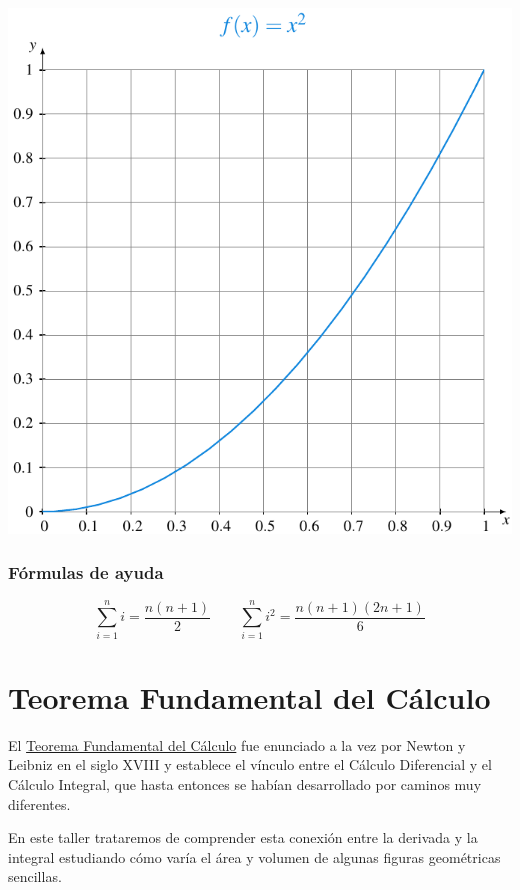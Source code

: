 \documentclass[
  a4paper,
]{scrreport}
\begin{document}
\includegraphics{img/sumas-riemann/parabola-figure0.pdf}

\hypertarget{fuxf3rmulas-de-ayuda}{%
\subsection{Fórmulas de ayuda}\label{fuxf3rmulas-de-ayuda}}

\[
\sum_{i=1}^n i = \dfrac{n(n+1)}{2}\qquad \sum_{i=1}^n i^2 = \dfrac{n(n+1)(2n+1)}{6}
\]


\hypertarget{teorema-fundamental-del-cuxe1lculo}{%
\chapter{Teorema Fundamental del
Cálculo}\label{teorema-fundamental-del-cuxe1lculo}}

El
\href{https://aprendeconalf.es/analisis-manual/09-integrales.html\#thm-teorema-fundamental-calculo-1}{Teorema
Fundamental del Cálculo} fue enunciado a la vez por Newton y Leibniz en
el siglo XVIII y establece el vínculo entre el Cálculo Diferencial y el
Cálculo Integral, que hasta entonces se habían desarrollado por caminos
muy diferentes.

En este taller trataremos de comprender esta conexión entre la derivada
y la integral estudiando cómo varía el área y volumen de algunas figuras
geométricas sencillas.
\end{document}
